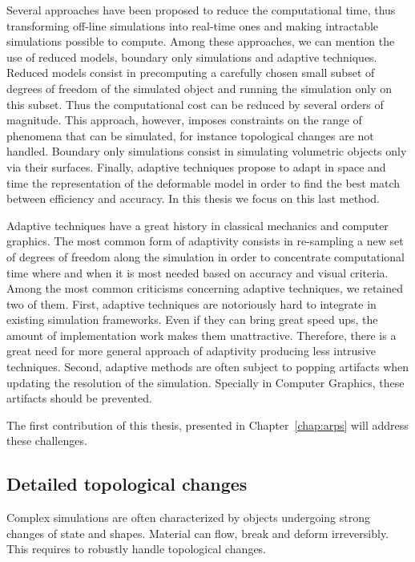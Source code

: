 Several approaches have been proposed to reduce the computational time, thus transforming off-line simulations into real-time ones and making intractable simulations possible to compute. 
Among these approaches, we can mention the use of reduced models, boundary only simulations and adaptive techniques. 
Reduced models consist in precomputing a carefully chosen small subset of degrees of freedom of the simulated object and running the simulation only on this subset. 
Thus the computational cost can be reduced by several orders of magnitude. 
This approach, however, imposes constraints on the range of phenomena that can be simulated, for instance topological changes are not handled. 
Boundary only simulations consist in simulating volumetric objects only via their surfaces. 
Finally, adaptive techniques propose to adapt in space and time the representation of the deformable model in order to find the best match between efficiency and accuracy. In this thesis we focus on this last method.

Adaptive techniques have a great history in classical mechanics and computer graphics. The most common form of adaptivity consists in re-sampling a new set of degrees of freedom along the simulation in order to concentrate computational time where and when it is most needed based on accuracy and visual criteria. Among the most common criticisms concerning adaptive techniques, we retained two of them. First, adaptive techniques are notoriously hard to integrate in existing simulation frameworks. Even if they can bring great speed ups, the amount of implementation work makes them unattractive. Therefore, there is a great need for more general approach of adaptivity producing less intrusive techniques. Second, adaptive methods are often subject to popping artifacts when updating the resolution of the simulation. Specially in Computer Graphics, these artifacts should be prevented.

The first contribution of this thesis, presented in Chapter~\ref{chap:arps} will address these challenges.

\subsection{Detailed topological changes}

Complex simulations are often characterized by objects undergoing strong changes of state and shapes. Material can flow, break and deform irreversibly. This requires to robustly handle topological changes. 


